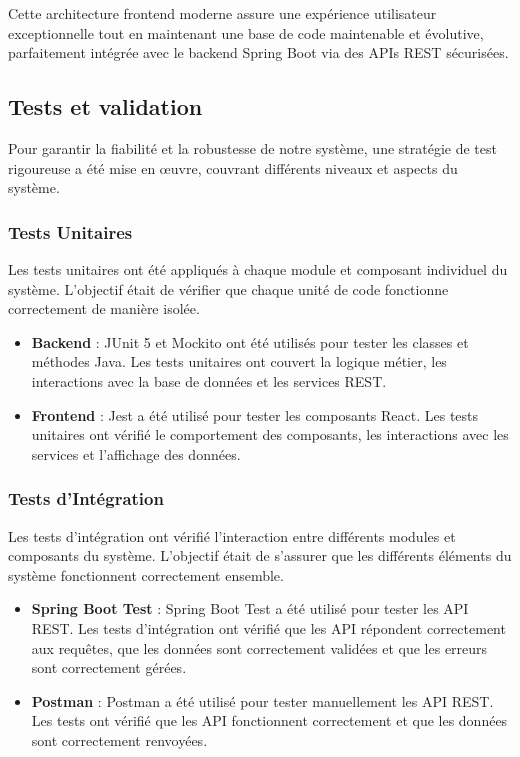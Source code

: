 \documentclass[12pt,a4paper]{report}
\begin{document}
Cette architecture frontend moderne assure une expérience utilisateur exceptionnelle tout en maintenant une base de code maintenable et évolutive, parfaitement intégrée avec le backend Spring Boot via des APIs REST sécurisées.

\subsection{Tests et validation}

Pour garantir la fiabilité et la robustesse de notre système, une stratégie de test rigoureuse a été mise en œuvre, couvrant différents niveaux et aspects du système.

\subsubsection{Tests Unitaires}

Les tests unitaires ont été appliqués à chaque module et composant individuel du système. L'objectif était de vérifier que chaque unité de code fonctionne correctement de manière isolée.

\begin{itemize}
\item \textbf{Backend} : JUnit 5 et Mockito ont été utilisés pour tester les classes et méthodes Java. Les tests unitaires ont couvert la logique métier, les interactions avec la base de données et les services REST.

\item \textbf{Frontend} : Jest a été utilisé pour tester les composants React. Les tests unitaires ont vérifié le comportement des composants, les interactions avec les services et l'affichage des données.
\end{itemize}

\subsubsection{Tests d'Intégration}

Les tests d'intégration ont vérifié l'interaction entre différents modules et composants du système. L'objectif était de s'assurer que les différents éléments du système fonctionnent correctement ensemble.

\begin{itemize}
\item \textbf{Spring Boot Test} : Spring Boot Test a été utilisé pour tester les API REST. Les tests d'intégration ont vérifié que les API répondent correctement aux requêtes, que les données sont correctement validées et que les erreurs sont correctement gérées.

\item \textbf{Postman} : Postman a été utilisé pour tester manuellement les API REST. Les tests ont vérifié que les API fonctionnent correctement et que les données sont correctement renvoyées.
\end{itemize}
\end{document}
